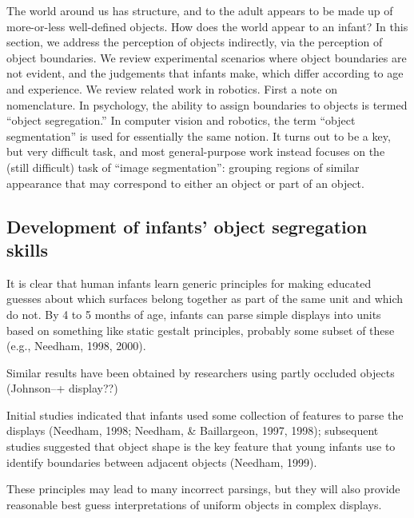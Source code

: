 
The world around us has structure, and to the adult appears to be made
up of more-or-less well-defined objects.  How does the world appear to
an infant?  In this section, we address the perception of objects
indirectly, via the perception of object boundaries.  We review
experimental scenarios where object boundaries are not evident, and
the judgements that infants make, which differ according to 
age and experience.  We review related work in robotics.
First a note on nomenclature.
%
In psychology, the ability to assign boundaries to objects is termed
``object segregation.''  In computer vision and robotics, the term
``object segmentation'' is used for essentially the same notion.  It
turns out to be a key, but very difficult task, and most
general-purpose work instead focuses on the (still difficult) task of
``image segmentation'': grouping regions of similar appearance that
may correspond to either an object or part of an object.  
%
%
%




\subsection{Development of infants' object segregation skills}

It is clear that human infants learn generic principles for making
educated guesses about which surfaces belong together as part of the
same unit and which do not.  By 4 to 5 months of age, infants can
parse simple displays into units based on something like static
gestalt principles, probably some subset of these (e.g., Needham,
1998, 2000).

Similar results have been obtained by researchers using partly
occluded objects (Johnson--+ display??)

Initial studies indicated that infants used some collection of
features to parse the displays (Needham, 1998; Needham, \& Baillargeon,
1997, 1998); subsequent studies suggested that object shape is the key
feature that young infants use to identify boundaries between adjacent
objects (Needham, 1999).

These principles may lead to many incorrect parsings, but they will
also provide reasonable best guess interpretations of uniform objects
in complex displays.  


